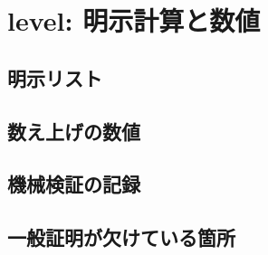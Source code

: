 
\section{level: 明示計算と数値}

\subsection{明示リスト}

\subsection{数え上げの数値}

\subsection{機械検証の記録}

\subsection{一般証明が欠けている箇所}

